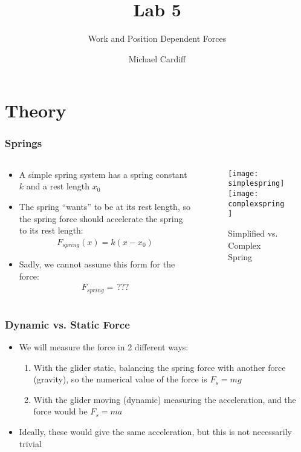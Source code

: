 \documentclass[handout,aspectratio=169]{beamer}
\title{Lab 5}
\author{Michael Cardiff}
\subtitle{Work and Position Dependent Forces}
\begin{document}
\begin{frame}
  \titlepage
\end{frame}

\section{Theory}
\begin{frame}
  \frametitle{Springs}
  \begin{columns}
    \begin{column}{0.5\textwidth}
      \begin{itemize}
      \item A simple spring system has a spring constant $k$ and a rest length $x_0$
      \item The spring ``wants'' to be at its rest length, so the spring force should accelerate the spring to its rest length:
        \begin{align*}
          F_{spring}(x)=k(x-x_0)
        \end{align*}
      \item Sadly, we cannot assume this form for the force:
        \begin{align*}
          F_{spring}=\,???
        \end{align*}
      \end{itemize}
    \end{column}
    \begin{column}{0.5\textwidth}
      \begin{figure}[H]
        \centering
        \texttt{[image: simplespring]}
        \texttt{[image: complexspring]}
        \caption{Simplified vs. Complex Spring}
      \end{figure}
    \end{column}
  \end{columns}
\end{frame}

\begin{frame}
  \frametitle{Dynamic vs. Static Force}
  \begin{itemize}
  \item We will measure the force in 2 different ways:
    \begin{enumerate}
    \item With the glider static, balancing the spring force with another force (gravity), so the numerical value of the force is $F_s=mg$
    \item With the glider moving (dynamic) measuring the acceleration, and the force would be $F_s=ma$
    \end{enumerate}
  \item Ideally, these would give the same acceleration, but this is not necessarily trivial
  \end{itemize}
\end{frame}
\end{document}
